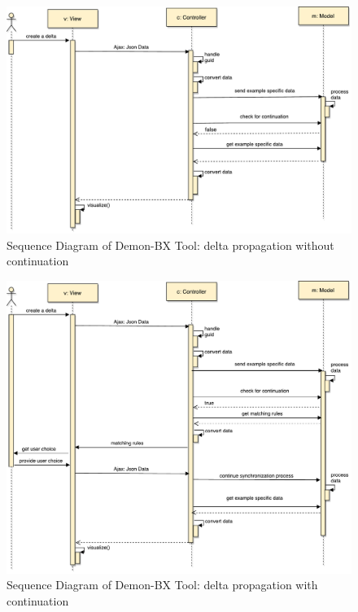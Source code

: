 \begin{figure}
	\centering
	\includegraphics[width=1\textwidth]{figures/Sequence_Diagram-HighLevel(cont-false)}
	\caption{Sequence Diagram of Demon-BX Tool: delta propagation without continuation}
	\label{fig:Sequence_Diagram-HighLevel(cont-false)}
\end{figure}

\begin{figure}
	\centering
	\includegraphics[width=1\textwidth]{figures/Sequence_Diagram-HighLevel(cont-true)}
	\caption{Sequence Diagram of Demon-BX Tool: delta propagation with continuation}
	\label{fig:Sequence_Diagram-HighLevel(cont-true)}
\end{figure}

